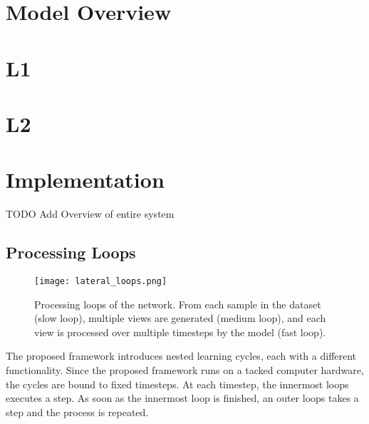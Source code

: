 \section{Model Overview}




\section{L1}

\section{L2}



\section{Implementation}
TODO Add Overview of entire system


\subsection{Processing Loops}
\begin{figure}[h]
    \centering
    \texttt{[image: lateral\_loops.png]}
    \caption[Processing loops of the network]{Processing loops of the network. From each sample in the dataset (slow loop), multiple views are generated (medium loop), and each view is processed over multiple timesteps by the model (fast loop).}
\end{figure}
The proposed framework introduces nested learning cycles, each with a different functionality. Since the proposed framework runs on a tacked computer hardware, the cycles are bound to fixed timesteps. At each timestep, the innermost loops executes a step. As soon as the innermost loop is finished, an outer loops takes a step and the process is repeated.

